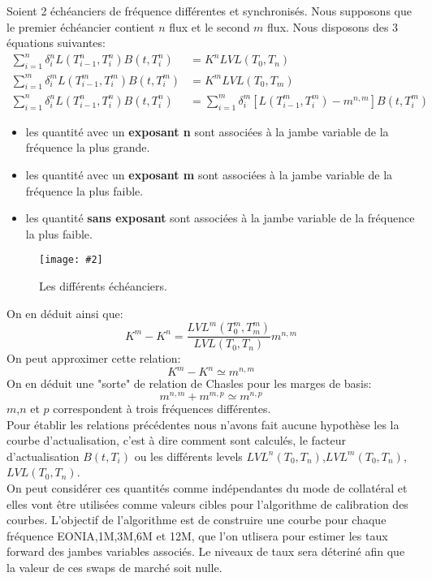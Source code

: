 \documentclass{article}
\newcommand{\FIG}[2]{\texttt{[image: \#2]}}
\begin{document}
Soient 2 échéanciers de fréquence différentes et synchronisés. Nous supposons que le premier échéancier contient $n$ flux et le second $m$ flux. Nous disposons des 3 équations suivantes:
\[
\begin{split}
\sum_{i=1}^{n} \delta^n_i L(T^n_{i-1},T^n_{i}) B(t,T^n_{i})&=K^n LVL(T_0,T_n)\\
\sum_{i=1}^{m} \delta^m_i L(T^m_{i-1},T^m_{i}) B(t,T^m_{i})&=K^m LVL(T_0,T_m)\\
\sum_{i=1}^{n} \delta^n_i L(T^n_{i-1},T^n_{i}) B(t,T^n_{i})&=\sum_{i=1}^{m} \delta^m_i [L(T^m_{i-1},T^m_{i})-m^{n,m}] B(t,T^m_{i})
\end{split}
\]
\begin{itemize}
\item les quantité avec un  \textbf{exposant n} sont associées à la jambe variable de la fréquence la plus grande.\\
\item les quantité avec un \textbf{exposant m} sont associées à la jambe variable de la fréquence la plus faible.\\
\item les quantité \textbf{sans exposant} sont associées à la jambe variable de la fréquence la plus faible.\\
\end{itemize}

\begin{center}
\begin{figure}[h]
\vspace{2mm}
\FIG{15cm}{figures/basis.png} 
\vspace{1mm}
\caption{Les différents échéanciers.}
\end{figure}
\end{center}


On en déduit ainsi que:
\[
K^m-K^n=\frac{LVL^m(T^m_0,T^m_m)}{LVL(T_0,T_n)} m^{n,m}
\]
On peut approximer cette relation:
\[
K^m-K^n \simeq m^{n,m}
\]
On en déduit une "sorte" de relation de Chasles pour les marges de basis:
\[
m^{n,m}+m^{m,p} \simeq m^{n,p}
\]
$m$,$n$ et $p$ correspondent à trois fréquences différentes.\\

Pour établir les relations précédentes nous n'avons fait aucune hypothèse les la courbe d'actualisation, c'est à dire comment sont calculés, le facteur d'actualisation $B(t,T_i)$ ou les différents levels $LVL^n(T_0,T_n)$,$LVL^m(T_0,T_n)$,$LVL(T_0,T_n)$.\\

On peut considérer ces quantités comme indépendantes du mode de collatéral et elles vont être utilisées comme valeurs cibles pour l'algorithme de calibration des courbes. L'objectif de l'algorithme est de construire une courbe pour chaque fréquence EONIA,1M,3M,6M et 12M, que l'on utlisera pour estimer les taux forward des jambes variables associés. Le niveaux de taux sera déteriné afin que la valeur de ces swaps de marché soit nulle.\\
\end{document}
